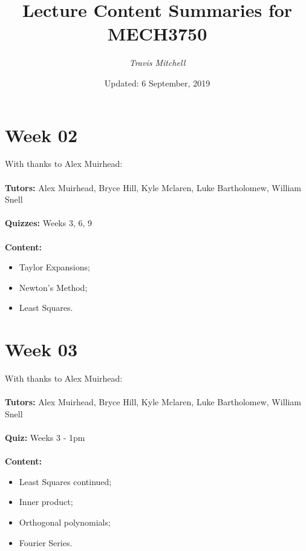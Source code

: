 \documentclass[11pt,a4paper]{report}
\author{\textit{Travis Mitchell}}
\title{Lecture Content Summaries for MECH3750}
\date{Updated: 6 September, 2019}
\begin{document}
	\maketitle
	\clearpage
	
	\begingroup
	\makeatletter
	\let\clearpage\relax
	\vspace*{\fill}
	\vspace*{\dimexpr-50\p@-\baselineskip}
	\chapter*{Week 02}
	With thanks to Alex Muirhead: \\\\
	\textbf{Tutors:} Alex Muirhead, Bryce Hill, Kyle Mclaren, Luke Bartholomew, William Snell \\\\
	\textbf{Quizzes:} Weeks 3, 6, 9 \\\\	
	\textbf{Content:}
	\begin{itemize}
		\item Taylor Expansions;
		\item Newton's Method;
		\item Least Squares.
	\end{itemize}
	\vspace*{\fill}
	\endgroup
	
	
	
	\begingroup
	\makeatletter
	\let\clearpage\relax
	\vspace*{\fill}%
	\vspace*{\dimexpr-50\p@-\baselineskip}
	\chapter*{Week 03}
	With thanks to Alex Muirhead: \\\\
	\textbf{Tutors:} Alex Muirhead, Bryce Hill, Kyle Mclaren, Luke Bartholomew, William Snell \\\\
	\textbf{Quiz:} Weeks 3 - 1pm \\\\	
	\textbf{Content:}
	\begin{itemize}
		\item Least Squares continued;
		\item Inner product;
		\item Orthogonal polynomials;
		\item Fourier Series.
	\end{itemize}
	\vspace*{\fill}
	\endgroup
	
	
\end{document}

